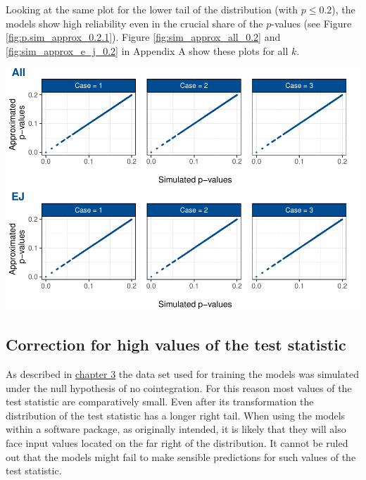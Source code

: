\documentclass[12pt,a4paper]{article}
\let\origfigure\figure
\let\endorigfigure\endfigure
\renewenvironment{figure}[1][2] {
    \expandafter\origfigure\expandafter[H]
} {
    \endorigfigure
}
\begin{document}
Looking at the same plot for the lower tail of the distribution (with
\(p \leq 0.2\)), the models show high reliability even in the crucial
share of the \(p\)-values (see Figure \ref{fig:p.sim_approx_0.2.1}).
Figure \ref{fig:sim_approx_all_0.2} and \ref{fig:sim_approx_e_j_0.2} in
Appendix A show these plots for all \(k\).

\begin{figure}
\centering
\includegraphics{p_approx_paper_files/figure-latex/p.sim_aprox_0.2.k1-1.pdf}
\caption{\label{fig:p.sim_approx_0.2.1} Simulated \(p\)-values plotted
against \(p\)-values approximated by final (corrected) models, exemplary
for \(k = 1\), for the lower tail of the distribution.}
\end{figure}

\hypertarget{correction-for-high-values-of-the-test-statistic}{%
\subsection{Correction for high values of the test
statistic}\label{correction-for-high-values-of-the-test-statistic}}

As described in \protect\hyperlink{simulation}{chapter 3} the data set
used for training the models was simulated under the null hypothesis of
no cointegration. For this reason most values of the test statistic are
comparatively small. Even after its transformation the distribution of
the test statistic has a longer right tail. When using the models within
a software package, as originally intended, it is likely that they will
also face input values located on the far right of the distribution. It
cannot be ruled out that the models might fail to make sensible
predictions for such values of the test statistic.
\end{document}
